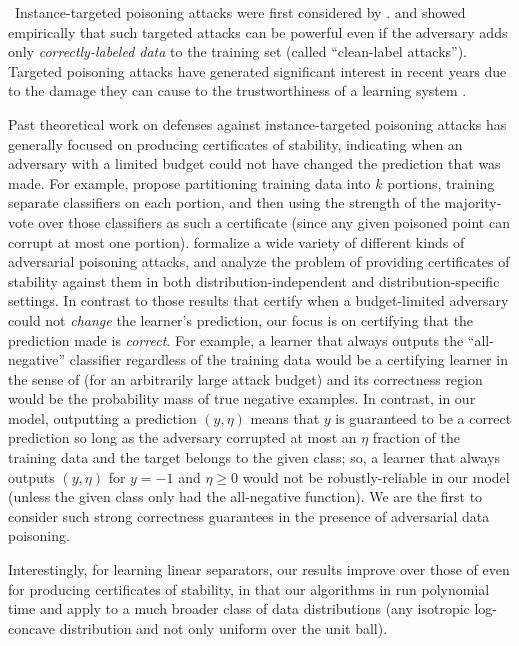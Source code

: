 \documentclass[11pt]{article}
\newcommand{\0}{\mathbf{0}}
\newcommand{\1}{\mathbf{1}}
\begin{document}
\smallskip

~Instance-targeted poisoning attacks were first considered by \cite{barreno2006can}.  \cite{shafahi2018poison} and \cite{suciu2018does} showed empirically that such targeted attacks can be powerful even if the adversary adds only {\em correctly-labeled data} to the training set (called ``clean-label attacks''). Targeted poisoning attacks have generated significant interest in recent years due to the damage they can cause to the trustworthiness of a learning system \citep{mozaffari2014systematic,chen2017targeted,geiping2020witches}.

Past theoretical work on defenses against instance-targeted poisoning attacks has generally focused on producing certificates of stability, indicating when an adversary with a limited budget could not have changed the prediction that was made.  For example, \cite{levine2020deep} propose partitioning training data into $k$ portions, training separate classifiers on each portion, and then using the strength of the majority-vote over those classifiers as such a certificate (since any given poisoned point can corrupt at most one portion).
\cite{gao2021learning} formalize a wide variety of different kinds of adversarial poisoning attacks, and analyze the problem of providing certificates of stability against them in both distribution-independent and distribution-specific settings.
In contrast to those results that certify when a budget-limited adversary could not {\em change} the learner's prediction, our focus is on certifying that the prediction made is {\em correct}.
For example, a learner that always outputs the ``all-negative'' classifier regardless of the training data would be a certifying learner in the sense of \cite{gao2021learning}  (for an arbitrarily large attack budget) and its correctness region would be the probability mass of true negative examples.  In contrast, in our model, outputting a prediction $(y,\eta)$ means that $y$ is guaranteed to be a correct prediction so long as the adversary corrupted at most an $\eta$ fraction of the training data and the target belongs to the given class; so, a learner that always outputs $(y,\eta)$ for $y=-1$ and $\eta\geq 0$ would not be robustly-reliable in our model (unless the given class only had the all-negative function).  We are the first to consider such strong correctness guarantees in the presence of adversarial data poisoning. 

Interestingly, for learning linear separators, our results improve over those of \cite{gao2021learning} even for producing certificates of stability, in that our algorithms in run polynomial time and apply to a much broader class of data distributions (any isotropic log-concave distribution and not only uniform over the unit ball).
\end{document}

